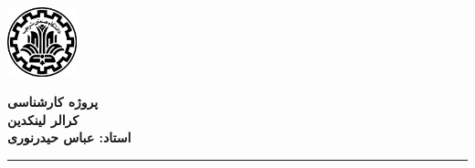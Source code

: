 \vspace*{-2cm}
\begin{flushleft}
	\includegraphics[width=0.15\textwidth]{pictures/Sharif_logo.png}
\end{flushleft}
\vspace*{-3cm}
\begin{flushright}
    {
    		{\LARGE\bfseries پروژه کارشناسی} \\
                {\LARGE\bfseries کرالر لینکدین }\\
    		{\Large\bfseries استاد: عباس حیدرنوری}
    }
\end{flushright}
\vspace{0.3cm}
\hrule
\vspace{0.3cm}
